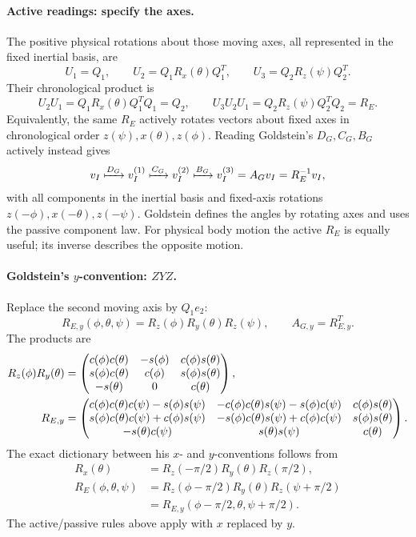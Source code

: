 \paragraph{Active readings: specify the axes.}
The positive physical rotations about those moving axes, all represented
in the fixed inertial basis, are
\[
 U_1=Q_1,\qquad U_2=Q_1R_x(\theta)Q_1^T,\qquad
 U_3=Q_2R_z(\psi)Q_2^T.
\]
Their chronological product is
\[
 U_2U_1=Q_1R_x(\theta)Q_1^TQ_1=Q_2,\qquad
 U_3U_2U_1=Q_2R_z(\psi)Q_2^TQ_2=R_E.
\]
Equivalently, the same $R_E$ actively rotates vectors about fixed axes in
chronological order $z(\psi),x(\theta),z(\phi)$.
Reading Goldstein's $D_G,C_G,B_G$ actively instead gives
\[
 v_I\xmapsto{D_G}v_I^{(1)}\xmapsto{C_G}v_I^{(2)}
 \xmapsto{B_G}v_I^{(3)}=A_Gv_I=R_E^{-1}v_I,
\]
with all components in the inertial basis and fixed-axis rotations
$z(-\phi),x(-\theta),z(-\psi)$.
Goldstein defines the angles by rotating axes and uses the passive
component law. For physical body motion the active $R_E$ is equally
useful; its inverse describes the opposite motion.

\paragraph{Goldstein's $y$-convention: $ZYZ$.}
Replace the second moving axis by $Q_1e_2$:
\begin{equation}\label{gnc:zyz-angles}
 R_{E,y}(\phi,\theta,\psi)=R_z(\phi)R_y(\theta)R_z(\psi),\qquad
 A_{G,y}=R_{E,y}^T.
\end{equation}
The products are
\begin{align}
 R_z(\phi)R_y(\theta)
 &=\begin{pmatrix}
 c(\phi)c(\theta)&-s(\phi)&c(\phi)s(\theta)\\
 s(\phi)c(\theta)&c(\phi)&s(\phi)s(\theta)\\
 -s(\theta)&0&c(\theta)
 \end{pmatrix},\notag\\
 R_{E,y}&=\begin{pmatrix}
 c(\phi)c(\theta)c(\psi)-s(\phi)s(\psi)&
 -c(\phi)c(\theta)s(\psi)-s(\phi)c(\psi)&c(\phi)s(\theta)\\
 s(\phi)c(\theta)c(\psi)+c(\phi)s(\psi)&
 -s(\phi)c(\theta)s(\psi)+c(\phi)c(\psi)&s(\phi)s(\theta)\\
 -s(\theta)c(\psi)&s(\theta)s(\psi)&c(\theta)
 \end{pmatrix}.\label{gnc:zyz-expanded}
\end{align}
The exact dictionary between his $x$- and $y$-conventions follows from
\begin{align*}
 R_x(\theta)&=R_z(-\pi/2)R_y(\theta)R_z(\pi/2),\\
 R_E(\phi,\theta,\psi)
 &=R_z(\phi-\pi/2)R_y(\theta)R_z(\psi+\pi/2)\\
 &=R_{E,y}(\phi-\pi/2,\theta,\psi+\pi/2).
\end{align*}
The active/passive rules above apply with $x$ replaced by $y$.

